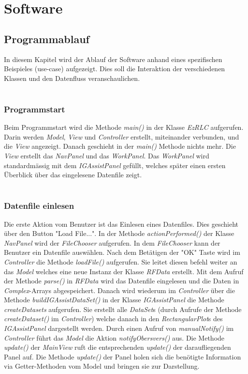 \documentclass[a4paper,oneside,abstract,numbers=noenddot]{scrreprt}
\title{\titel}
\author{\autorA  \and \AutorB \and \AutorC \and \AutorD \and \AutorE \and \AutorF}
\date{\datum}
\begin{document}
\chapter{Software} \label{sec:Konzept} 

\section{Programmablauf}
In diesem Kapitel wird der Ablauf der Software anhand eines spezifischen Beispieles (use-case) aufgezeigt. Dies soll die Interaktion der verschiedenen Klassen und den Datenfluss veranschaulichen.\\
\\
\subsection{Programmstart}
Beim Programmstart wird die Methode \textit{main()} in der Klasse \textit{EzRLC} aufgerufen. Darin werden \textit{Model}, \textit{View} und \textit{Controller} erstellt, miteinander verbunden, und die \textit{View} angezeigt. Danach geschieht in der \textit{main()} Methode nichts mehr. Die \textit{View} erstellt das \textit{NavPanel} und das \textit{WorkPanel}. Das \textit{WorkPanel} wird standardmässig mit dem \textit{IGAssistPanel} gefüllt, welches später einen ersten Überblick über das eingelesene Datenfile zeigt. \\
\\
\subsection{Datenfile einlesen}
Die erste Aktion vom Benutzer ist das Einlesen eines Datenfiles. Dies geschieht über den Button "{}Load File..."{}. In der Methode \textit{actionPerformed()} der Klasse \textit{NavPanel} wird der \textit{FileChooser} aufgerufen. In dem \textit{FileChooser} kann der Benutzer ein Datenfile auswählen. Nach dem Betätigen der "{}OK"{} Taste wird im \textit{Controller} die Methode \textit{loadFile()} aufgerufen. Sie leitet diesen befehl weiter an das \textit{Model} welches eine neue Instanz der Klasse \textit{RFData} erstellt. Mit dem Aufruf der Methode \textit{parse()} in \textit{RFData} wird das Datenfile eingelesen und die Daten in \textit{Complex}-Arrays abgespeichert. Danach wird wiederum im \textit{Controller} über die Methode \textit{buildIGAssistDataSet()} in der Klasse \textit{IGAssistPanel} die Methode \textit{createDatasets} aufgerufen. Sie erstellt alle \textit{DataSet}s (durch Aufrufe der Methode \textit{createDataset()} im \textit{Controller}) welche danach in den \textit{RectangularPlot}s des \textit{IGAssistPanel} dargestellt werden. Durch einen Aufruf von \textit{manualNotify()} im \textit{Controller} führt das \textit{Model} die Aktion \textit{notifyObersvers()} aus. Die Methode \textit{update()} der \textit{MainView} ruft die entsprechenden \textit{update()} der daraufliegenden Panel auf. Die Methode \textit{update()} der Panel holen sich die benötigte Information via Getter-Methoden vom Model und bringen sie zur Darstellung.\\
\\
\end{document}
